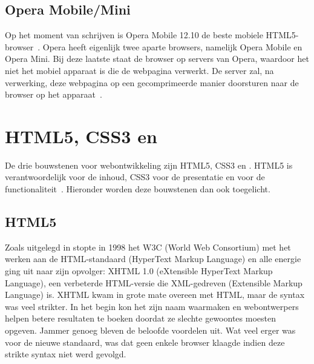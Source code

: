 \subsection{Opera Mobile/Mini}
Op het moment van schrijven is Opera Mobile 12.10 de beste mobiele HTML5-browser~\cite{Sights2012}. 
Opera heeft eigenlijk twee aparte browsers, namelijk Opera Mobile en Opera Mini. 
Bij deze laatste staat de browser  op servers van Opera, waardoor het niet het mobiel apparaat is die de webpagina verwerkt. 
De server zal, na verwerking, deze webpagina op een gecomprimeerde manier doorsturen naar de browser op het apparaat~\cite{PhilDutson2012}.



\section{HTML5, CSS3 en \js}
\label{sec:html5-css3-js}
De drie bouwstenen voor webontwikkeling zijn HTML5, CSS3 en \js{}. 
HTML5 is verantwoordelijk voor de inhoud, CSS3 voor de presentatie en \js{} voor de functionaliteit~\cite{PhilDutson2012}. 
Hieronder worden deze bouwstenen dan ook toegelicht.

\subsection{HTML5}
Zoals uitgelegd in \cite{MacDonald2011} stopte in 1998 het W3C (World Web Consortium) met het werken aan de HTML-standaard (HyperText Markup Language) en alle energie ging uit naar zijn opvolger: XHTML 1.0 (eXtensible HyperText Markup Language), een verbeterde HTML-versie die XML-gedreven (Extensible Markup Language) is. 
XHTML kwam in grote mate overeen met HTML, maar de syntax was veel strikter. 
In het begin kon het zijn naam waarmaken en webontwerpers helpen betere resultaten te boeken doordat ze slechte gewoontes moesten opgeven. 
Jammer genoeg bleven de beloofde voordelen uit. 
Wat veel erger was voor de nieuwe standaard, was dat geen enkele browser klaagde indien deze strikte syntax niet werd gevolgd.


